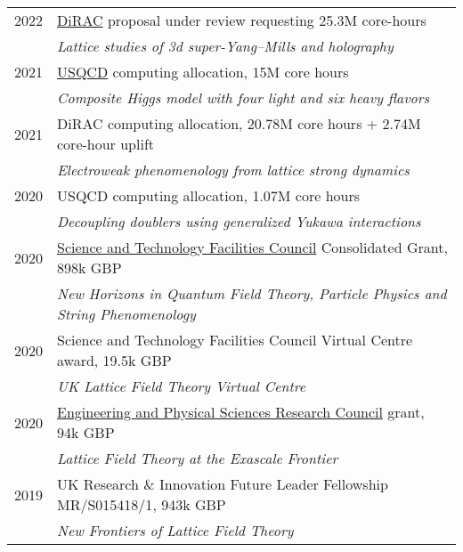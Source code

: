 \documentclass[10 pt]{article}
\begin{document}
\vspace{-12 pt} %
\begin{tabular}[t]{cl}
  2022 & \href{https://dirac.ac.uk}{DiRAC} proposal under review requesting 25.3M core-hours                  \\ %
       & \textit{Lattice studies of 3d super-Yang--Mills and holography}                                      \\[6 pt]
  2021 & \href{http://www.usqcd.org}{USQCD} computing allocation, 15M core hours                              \\ %
       & \textit{Composite Higgs model with four light and six heavy flavors}                                 \\[6 pt]
  2021 & DiRAC computing allocation, 20.78M core hours + 2.74M core-hour uplift                               \\ %
       & \textit{Electroweak phenomenology from lattice strong dynamics}                                      \\[6 pt]
  2020 & USQCD computing allocation, 1.07M core hours                                                         \\ %
       & \textit{Decoupling doublers using generalized Yukawa interactions}                                   \\[6 pt]
  2020 & \href{https://stfc.ukri.org}{Science and Technology Facilities Council} Consolidated Grant, 898k GBP \\
       & \textit{New Horizons in Quantum Field Theory, Particle Physics and String Phenomenology}             \\[6 pt]
  2020 & Science and Technology Facilities Council Virtual Centre award, 19.5k GBP                            \\
       & \textit{UK Lattice Field Theory Virtual Centre}                                                      \\[6 pt]
  2020 & \href{https://epsrc.ukri.org}{Engineering and Physical Sciences Research Council} grant, 94k GBP     \\
       & \textit{Lattice Field Theory at the Exascale Frontier}                                               \\[6 pt]
  2019 & UK Research \& Innovation Future Leader Fellowship {MR/S015418/1}, 943k GBP                          \\
       & \textit{New Frontiers of Lattice Field Theory}                                                       \\[6 pt]
\end{tabular}
\end{document}
